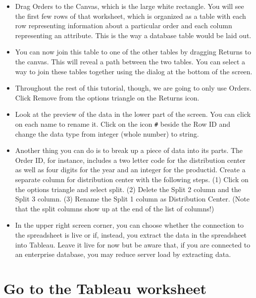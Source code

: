 \begin{itemize}
\tightlist
\item
  Drag Orders to the Canvas, which is the large white rectangle. You
  will see the first few rows of that worksheet, which is organized as a
  table with each row representing information about a particular order
  and each column representing an attribute. This is the way a database
  table would be laid out.
\item
  You can now join this table to one of the other tables by dragging
  Returns to the canvas. This will reveal a path between the two tables.
  You can select a way to join these tables together using the dialog at
  the bottom of the screen.
\item
  Throughout the rest of this tutorial, though, we are going to only use
  Orders. Click Remove from the options triangle on the Returns icon.
\item
  Look at the preview of the data in the lower part of the screen. You
  can click on each name to rename it. Click on the icon \texttt{\#}
  beside the Row ID and change the data type from integer (whole number)
  to string.
\item
  Another thing you can do is to break up a piece of data into its
  parts. The Order ID, for instance, includes a two letter code for the
  distribution center as well as four digits for the year and an integer
  for the productid. Create a separate column for distribution center
  with the following steps. (1) Click on the options triangle and select
  split. (2) Delete the Split 2 column and the Split 3 column. (3)
  Rename the Split 1 column as Distribution Center. (Note that the split
  columns show up at the end of the list of columns!)
\item
  In the upper right screen corner, you can choose whether the
  connection to the spreadsheet is live or if, instead, you extract the
  data in the spreadsheet into Tableau. Leave it live for now but be
  aware that, if you are connected to an enterprise database, you may
  reduce server load by extracting data.
\end{itemize}

\section{Go to the Tableau worksheet}\label{go-to-the-tableau-worksheet}

